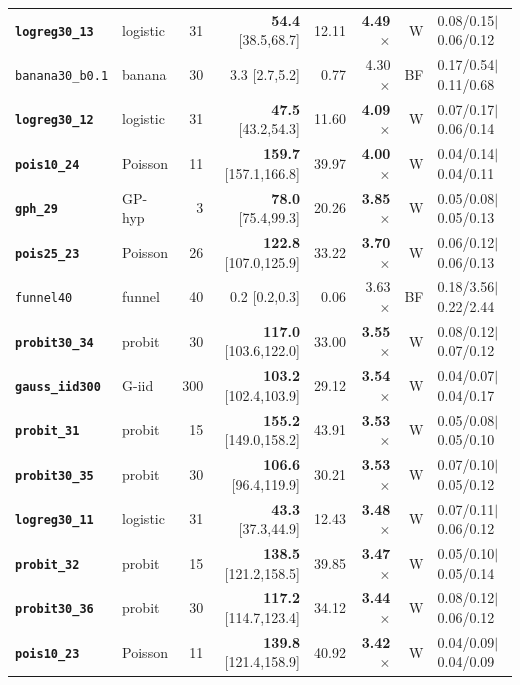 {\begin{longtable}{llrrrrrl}
\textbf{\texttt{logreg30\_13}} & logistic & 31 & \textbf{54.4} [38.5,68.7] & 12.11 & \textbf{4.49$\times$} & W & 0.08/0.15$\mid$0.06/0.12\\
\texttt{banana30\_b0.1} & banana & 30 & 3.3 [2.7,5.2] & 0.77 & 4.30$\times$ & BF & 0.17/0.54$\mid$0.11/0.68\\
\textbf{\texttt{logreg30\_12}} & logistic & 31 & \textbf{47.5} [43.2,54.3] & 11.60 & \textbf{4.09$\times$} & W & 0.07/0.17$\mid$0.06/0.14\\
\textbf{\texttt{pois10\_24}} & Poisson & 11 & \textbf{159.7} [157.1,166.8] & 39.97 & \textbf{4.00$\times$} & W & 0.04/0.14$\mid$0.04/0.11\\
\textbf{\texttt{gph\_29}} & GP-hyp & 3 & \textbf{78.0} [75.4,99.3] & 20.26 & \textbf{3.85$\times$} & W & 0.05/0.08$\mid$0.05/0.13\\
\textbf{\texttt{pois25\_23}} & Poisson & 26 & \textbf{122.8} [107.0,125.9] & 33.22 & \textbf{3.70$\times$} & W & 0.06/0.12$\mid$0.06/0.13\\
\texttt{funnel40} & funnel & 40 & 0.2 [0.2,0.3] & 0.06 & 3.63$\times$ & BF & 0.18/3.56$\mid$0.22/2.44\\
\textbf{\texttt{probit30\_34}} & probit & 30 & \textbf{117.0} [103.6,122.0] & 33.00 & \textbf{3.55$\times$} & W & 0.08/0.12$\mid$0.07/0.12\\
\textbf{\texttt{gauss\_iid300}} & G-iid & 300 & \textbf{103.2} [102.4,103.9] & 29.12 & \textbf{3.54$\times$} & W & 0.04/0.07$\mid$0.04/0.17\\
\textbf{\texttt{probit\_31}} & probit & 15 & \textbf{155.2} [149.0,158.2] & 43.91 & \textbf{3.53$\times$} & W & 0.05/0.08$\mid$0.05/0.10\\
\textbf{\texttt{probit30\_35}} & probit & 30 & \textbf{106.6} [96.4,119.9] & 30.21 & \textbf{3.53$\times$} & W & 0.07/0.10$\mid$0.05/0.12\\
\textbf{\texttt{logreg30\_11}} & logistic & 31 & \textbf{43.3} [37.3,44.9] & 12.43 & \textbf{3.48$\times$} & W & 0.07/0.11$\mid$0.06/0.12\\
\textbf{\texttt{probit\_32}} & probit & 15 & \textbf{138.5} [121.2,158.5] & 39.85 & \textbf{3.47$\times$} & W & 0.05/0.10$\mid$0.05/0.14\\
\textbf{\texttt{probit30\_36}} & probit & 30 & \textbf{117.2} [114.7,123.4] & 34.12 & \textbf{3.44$\times$} & W & 0.08/0.12$\mid$0.06/0.12\\
\textbf{\texttt{pois10\_23}} & Poisson & 11 & \textbf{139.8} [121.4,158.9] & 40.92 & \textbf{3.42$\times$} & W & 0.04/0.09$\mid$0.04/0.09\\

\end{longtable}}
